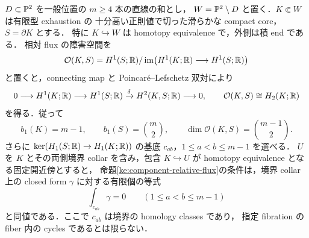 \begin{proposition}
\label{ke:component-flux-space}
$D\subset\mathbb P^2$ を一般位置の $m\ge4$ 本の直線の和とし，
$W=\mathbb P^2\setminus D$ と置く．$K\Subset W$ は有限型 exhaustion の
十分高い正則値で切った滑らかな compact core，$S=\partial K$ とする．
特に $K\hookrightarrow W$ は homotopy equivalence で，外側は積 end である．
相対 flux の障害空間を
\[
 \mathcal O(K,S)=H^1(S;\mathbb R)/
 \operatorname{im}\bigl(H^1(K;\mathbb R)\longrightarrow H^1(S;\mathbb R)\bigr)
\]
と置くと，connecting map と Poincar\'e--Lefschetz 双対により
\begin{equation}\label{ke:eq:line-core-flux-sequence}
 0\longrightarrow H^1(K;\mathbb R)\longrightarrow H^1(S;\mathbb R)
 \xrightarrow{\delta} H^2(K,S;\mathbb R)\longrightarrow0,
 \qquad \mathcal O(K,S)\cong H_2(K;\mathbb R)
\end{equation}
を得る．従って
\begin{equation}\label{ke:eq:line-core-flux-dimension}
 b_1(K)=m-1,\qquad b_1(S)=\binom m2,\qquad
 \dim\mathcal O(K,S)=\binom{m-1}{2}.
\end{equation}
さらに $\ker(H_1(S;\mathbb R)\to H_1(K;\mathbb R))$ の基底
$c_{ab}$，$1\le a<b\le m-1$ を選べる．
$U$ を $K$ とその両側境界 collar を含み，包含 $K\hookrightarrow U$ が
homotopy equivalence となる固定開近傍とすると，
命題\ref{ke:component-relative-flux}の条件は，境界 collar 上の closed form
$\gamma$ に対する有限個の等式
\begin{equation}\label{ke:eq:line-core-flux-periods}
 \int_{c_{ab}}\gamma=0\qquad(1\le a<b\le m-1)
\end{equation}
と同値である．ここで $c_{ab}$ は境界の homology classes であり，
指定 fibration の fiber 内の cycles であるとは限らない．
\end{proposition}

